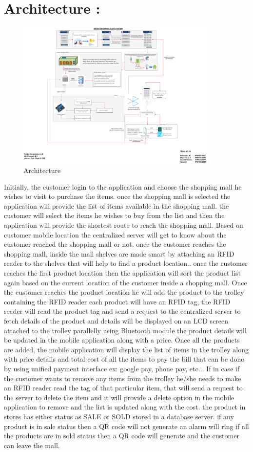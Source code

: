 \documentclass[conference]{IEEEtran}
\begin{document}
\section{Architecture :}
\begin{figure}[htbp]
	\centerline{\includegraphics[width=100mm]{download}}
	\caption{Architecture}
	\label{fig}
\end{figure}
Initially, the customer login to the application and choose the shopping mall he wishes to visit to purchase the items. once the shopping mall is selected the application will provide the list of items available in the shopping mall. the customer will select the items he wishes to buy from the list and then the application will provide the shortest route to reach the shopping mall\cite{b4}. Based on customer mobile location the centralized server will get to know about the customer reached the shopping mall or not. once the customer reaches the shopping mall, inside the mall shelves are made smart by attaching an RFID reader to the shelves that will help to find a product location.. once the customer reaches the first product location then the application will sort the product list again based on the current location of the customer inside a shopping mall. Once the customer reaches the product location he will add the product to the trolley containing the RFID reader each product will have an RFID tag, the RFID reader will read the product tag and send a request to the centralized server to fetch details of the product and details will be displayed on an LCD screen attached to the trolley parallelly using Bluetooth module the product details will be updated in the mobile application along with a price\cite{b1}. Once all the products are added, the mobile application will display the list of items in the trolley along with price details and total cost of all the items to pay the bill that can be done by using unified payment interface ex: google pay, phone pay, etc... If in case if the customer wants to remove any items from the trolley he/she needs to make an RFID reader read the tag of that particular item, that will send a request to the server to delete the item and it will provide a delete option in the mobile application to remove and the list is updated along with the cost. the product in stores has either status as SALE or SOLD stored in a database server\cite{b3}. if any product is in sale status then a QR code will not generate an alarm will ring if all the products are in sold status then a QR code will generate and the customer can leave the mall\cite{b3}.
\end{document}
